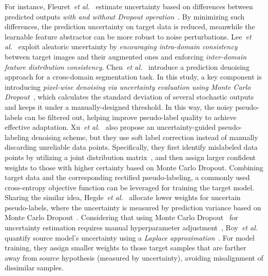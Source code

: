\documentclass[10pt,journal,compsoc]{IEEEtran}
\def\etal{{\em et al.}}
\begin{document}
For instance, Fleuret~\etal~\cite{fleuret2021uncertainty} estimate uncertainty based on differences between predicted outputs \emph{with and without Dropout operation}~\cite{srivastava2014dropout}.
By minimizing such differences, the prediction uncertainty on target data is reduced, meanwhile the learnable feature abstractor can be more robust to noise perturbations.
Lee~\etal~\cite{lee2022feature} exploit aleatoric uncertainty by \emph{encouraging intra-domain consistency} between target images and their augmented ones and enforcing \emph{inter-domain feature distribution consistency}.
Chen~\etal~\cite{chen2021source} introduce a prediction denoising approach for a cross-domain segmentation task.
In this study, a key component is introducing \emph{pixel-wise denoising via uncertainty evaluation using Monte Carlo Dropout}~\cite{gal2016dropout, kendall2017uncertainties}, which calculates the standard deviation of several stochastic outputs and keeps it under a manually-designed threshold.
In this way, the noisy pseudo-labels can be filtered out, helping improve pseudo-label quality to achieve effective adaptation.
Xu~\etal~\cite{xu2022denoising} also propose an uncertainty-guided pseudo-labeling denoising scheme, but they use soft label correction instead of manually discarding unreliable data points. %
Specifically, they first identify mislabeled data points by utilizing a joint distribution matrix~\cite{xu2021noisy, northcutt2021confident}, and then assign larger confident weights to those with higher certainty based on Monte Carlo Dropout.
Combining target data and the corresponding rectified pseudo-labeling, a commonly used cross-entropy objective function can be leveraged for training the target model.
Sharing the similar idea, Hegde~\etal~\cite{hegde2021uncertainty} allocate lower weights for uncertain pseudo-labels, where the uncertainty is measured by prediction variance based on Monte Carlo Dropout~\cite{gal2016dropout, kendall2017uncertainties}.
Considering that using Monte Carlo Dropout~\cite{gal2016dropout} for uncertainty estimation requires manual hyperparameter adjustment~\cite{gal2017concrete}, Roy~\etal~\cite{roy2022uncertainty} quantify source model's uncertainty using a \emph{Laplace approximation}~\cite{tierney1986accurate, mackay2003information}.
For model training, they assign smaller weights to those target samples that are farther away from source hypothesis (measured by uncertainty), avoiding misalignment of dissimilar samples.
\end{document}
